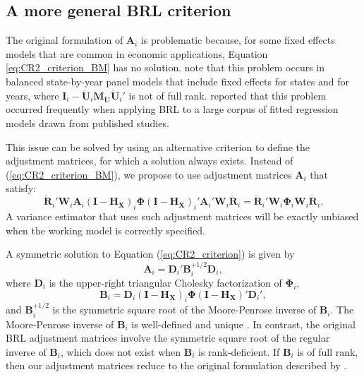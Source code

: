 \documentclass[12pt]{article}\usepackage[]{graphicx}\usepackage[]{color}
\newcommand{\bm}{\mathbf}
\newcommand{\bs}{\boldsymbol}
\begin{document}
\subsection{A more general BRL criterion}

The original formulation of $\bm{A}_i$ is problematic because, for some fixed effects models that are common in economic applications, Equation \ref{eq:CR2_criterion_BM} has no solution. 
\citet{Angrist2009mostly} note that this problem occurs in balanced state-by-year panel models that include fixed effects for states and for years, where $\bm{I}_i - \bm{\ddot{U}}_i \bm{M_{\ddot{U}}} \bm{\ddot{U}}_i'$ is not of full rank. 
\citet{Young2016improved} reported that this problem occurred frequently when applying BRL to a large corpus of fitted regression models drawn from published studies.

This issue can be solved by using an alternative criterion to define the adjustment matrices, for which a solution always exists. 
Instead of (\ref{eq:CR2_criterion_BM}), we propose to use adjustment matrices $\bm{A}_i$ that satisfy:
\begin{equation}
\label{eq:CR2_criterion}
\bm{\ddot{R}}_i' \bm{W}_i \bm{A}_i \left(\bm{I} - \bm{H_X}\right)_i \bs\Phi \left(\bm{I} - \bm{H_X}\right)_i' \bm{A}_i' \bm{W}_i \bm{\ddot{R}}_i = \bm{\ddot{R}}_i' \bm{W}_i \bs\Phi_i \bm{W}_i \bm{\ddot{R}}_i.
\end{equation}
A variance estimator that uses such adjustment matrices will be exactly unbiased when the working model is correctly specified.

A symmetric solution to Equation (\ref{eq:CR2_criterion}) is given by
\begin{equation}
\label{eq:CR2_adjustment}
\bm{A}_i = \bm{D}_i' \bm{B}_i^{+1/2} \bm{D}_i,
\end{equation}
where $\bm{D}_i$ is the upper-right triangular Cholesky factorization of $\bs\Phi_i$, 
\begin{equation}
\label{eq:CR2_Bmatrix}
\bm{B}_i = \bm{D}_i\left(\bm{I} - \bm{H_X}\right)_i \bs\Phi \left(\bm{I} - \bm{H_X}\right)' \bm{D}_i',
\end{equation}
and $\bm{B}_i^{+1/2}$ is the symmetric square root of the Moore-Penrose inverse of $\bm{B}_i$. 
The Moore-Penrose inverse of $\bm{B}_i$ is well-defined and unique \citep[][Thm. 9.18]{Banerjee2014linear}. 
In contrast, the original BRL adjustment matrices involve the symmetric square root of the regular inverse of $\bm{B}_i$, which does not exist when $\bm{B}_i$ is rank-deficient. If $\bm{B}_i$ is of full rank, then our adjustment matrices reduce to the original formulation described by \citet{Bell2002bias}. 
\end{document}

